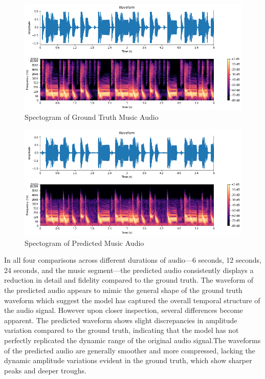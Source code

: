 \documentclass{ioereport}
\begin{document}
    \begin{figure}[H]
        \centering
        \includegraphics[width=\linewidth]{assets/audio_results/music.png}
        \caption{Spectogram of Ground Truth Music Audio}
        \label{fig:gt-music-spec}
    \end{figure}
    
    \begin{figure}[H]
        \centering
        \includegraphics[width=\linewidth]{assets/audio_results/musicpred.png}
        \caption{Spectogram of Predicted Music Audio}
        \label{fig:pred-music-spec}
    \end{figure}

    
    In all four comparisons across different durations of audio—6 seconds, 12 seconds, 24 seconds, and the music segment—the predicted audio consistently displays a reduction in detail and fidelity compared to the ground truth. The waveform of the predicted audio appears to mimic the general shape of the ground truth waveform which suggest the model has captured the overall temporal structure of the audio signal. However upon closer inspection, several differences become apparent. The predicted waveform shows slight discrepancies in amplitude variation compared to the ground truth, indicating that the model has not perfectly replicated the dynamic range of the original audio signal.The waveforms of the predicted audio are generally smoother and more compressed, lacking the dynamic amplitude variations evident in the ground truth, which show sharper peaks and deeper troughs. 
    
\end{document}
